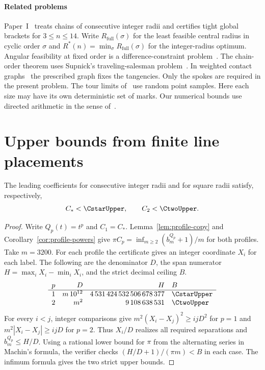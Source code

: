 \documentclass[review,hidelinks,onefignum,onetabnum]{siamart251216}
\newcommand{\Rstar}{R^\ast}
\newcommand{\full}{R_{\mathrm{full}}}
\newcommand{\CC}{C_\ast}
\begin{document}
\paragraph*{Related problems}
Paper~I~\cite{paperI} treats chains of consecutive integer radii and
certifies tight global brackets for $3\le n\le14$. Write
$\full(\sigma)$ for the least feasible central radius in cyclic order
$\sigma$ and $\Rstar(n)=\min_\sigma\full(\sigma)$ for the integer-radius
optimum. Angular feasibility at fixed order is a difference-constraint
problem~\cite{paperI,temporal}. The chain-order theorem uses Supnick's
traveling-salesman problem~\cite{supnick,burkard}. In weighted contact
graphs~\cite{contact} the prescribed graph fixes the tangencies. Only the spokes are required
in the present problem. The tour limits of~\cite{bhh,steele} use random point samples. Here
each size may have its own deterministic set of marks. Our numerical
bounds use directed arithmetic in the sense of~\cite{rump,tucker}.




\section{Upper bounds from finite line placements}\label{sec:upper}

\begin{proposition}\label{prop:cert-upper}
The leading coefficients for consecutive integer radii and for square
radii satisfy, respectively,
\[
 \CC<\CstarUpper,\qquad C_2<\CtwoUpper .
\]
\end{proposition}
\begin{proof}
Write $Q_p(t)=t^p$ and $C_1=\CC$. Lemma~\ref{lem:profile-copy} and
Corollary~\ref{cor:profile-powers} give
$\pi C_p=\inf_{m\ge2}(b_m^{Q_p}+1)/m$ for both profiles.
Take $m=3200$. For each profile the certificate gives an integer
coordinate $X_i$ for each label. The following are the denominator $D$,
the span numerator $H=\max_i X_i-\min_i X_i$, and the strict decimal
ceiling $B$.
\[
\begin{array}{c r r l}
 p & D & H & B\\ \hline
 1 & m\,10^{12} & 4\,531\,424\,532\,506\,678\,377 & \CstarUpper\\
 2 & m^2 & 9\,108\,638\,531 & \CtwoUpper
\end{array}
\]
For every $i<j$, integer comparisons give
$m^2(X_i-X_j)^2\ge ijD^2$ for $p=1$ and
$m^2|X_i-X_j|\ge ijD$ for $p=2$. Thus $X_i/D$ realizes all required
separations and $b_m^{Q_p}\le H/D$. Using a rational lower bound for
$\pi$ from the alternating series in Machin's formula, the verifier checks
$(H/D+1)/(\pi m)<B$ in each case. The infimum formula gives the two
strict upper bounds.
\end{proof}
\end{document}
